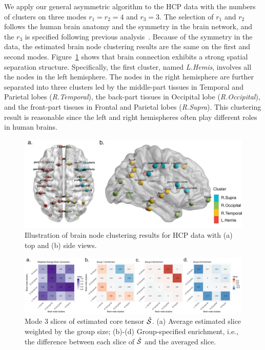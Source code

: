 \documentclass[journal]{IEEEtran}
\theoremstyle{definition}
\theoremstyle{definition}
\begin{document}
We apply our general asymmetric algorithm to the HCP data with the numbers of clusters on three modes $r_1 = r_2 = 4$ and $r_3 = 3$. The selection of $r_1$ and $r_2$ follows the human brain anatomy and the symmetry in the brain network, and the $r_3$ is specified following previous analysis~\citep{hu2021generalized}. Because of the symmetry in the data, the estimated brain node clustering results are the same on the first and second modes. Figure~\ref{fig:cluster_brain} shows that brain connection exhibits a strong spatial separation structure. Specifically, the first cluster, named \emph{L.Hemis}, involves all the nodes in the left hemisphere. The nodes in the right hemisphere are further separated into three clusters led by the middle-part tissues in Temporal and Parietal lobes (\emph{R.Temporal}), the back-part tissues in Occipital lobe (\emph{R.Occipital}), and the front-part tissues in Frontal and Parietal lobes (\emph{R.Supra}). This clustering result is reasonable since the left and right hemispheres often play different roles in human brains. 

\begin{figure}[htb]
    \centering
    \includegraphics[width = .7\textwidth]{brain_node_cluster.pdf}
    \caption{Illustration of brain node clustering results for HCP data with (a) top and (b) side views. }
    \label{fig:cluster_brain}
\end{figure}

\begin{figure}[htb]
    \centering
    \includegraphics[width = 1\textwidth]{est_S_anno.pdf}
    \caption{Mode 3 slices of estimated core tensor $\hat {\mathcal{S}}$. (a) Average estimated slice weighted by the group size; (b)-(d) Group-specified enrichment, i.e., the difference between each slice of $\hat {\mathcal{S}}$ and the averaged slice. }
    \label{fig:ests}
\end{figure}
\end{document}

